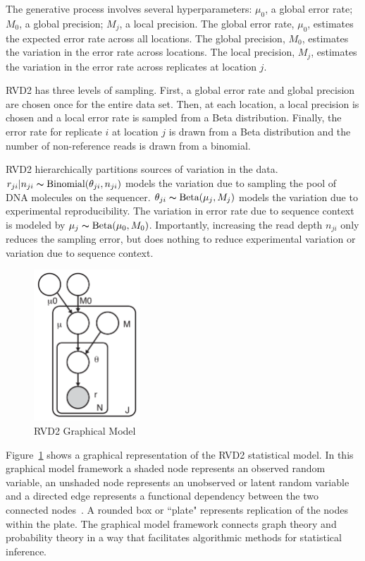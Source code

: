 \documentclass[11pt,reqno]{amsart}
\begin{document}
The generative process involves several hyperparameters: $\mu_0$, a global error rate; $M_0$, a global precision; $M_j$, a local precision. The global error rate, $\mu_0$, estimates the expected error rate across all locations. The global precision, $M_0$, estimates the variation in the error rate  across locations. The local precision, $M_j$, estimates the variation in the error rate across replicates at location $j$.

RVD2 has three levels of sampling. First, a global error rate and global precision are chosen once for the entire data set. Then, at each location, a local precision is chosen and a local error rate is sampled from a Beta distribution. Finally, the error rate for replicate $i$ at location $j$ is drawn from a Beta distribution and the number of non-reference reads is drawn from a binomial.

RVD2 hierarchically partitions sources of variation in the data. $r_{ji} | n_{ji} \thicksim \text{Binomial}(\theta_{ji}, n_{ji})$ models the variation due to sampling the pool of DNA molecules on the sequencer. $\theta_{ji} \thicksim \text{Beta}(\mu_j, M_j)$ models the variation due to experimental reproducibility. The variation in error rate due to sequence context is modeled by $\mu_j \thicksim \text{Beta}(\mu_0, M_0)$. Importantly, increasing the read depth $n_{ji}$ only reduces the sampling error, but does nothing to reduce experimental variation or variation due to sequence context.

\begin{figure}[h]
\begin{center}
\includegraphics[width=40mm]{pdf_figs/RVD2_model.pdf}
\caption{RVD2 Graphical Model}
\label{fig:graphical_model}
\end{center}
\end{figure}

Figure~\ref{fig:graphical_model} shows a graphical representation of the RVD2 statistical model. In this graphical model framework a shaded node represents an observed random variable, an unshaded node represents an unobserved or latent random variable and a directed edge represents a functional dependency between the two connected nodes~\citep{Jordan2004}. A rounded box or ``plate" represents replication of the nodes within the plate. The graphical model framework connects graph theory and probability theory in a way that facilitates algorithmic methods for statistical inference.
\end{document}
